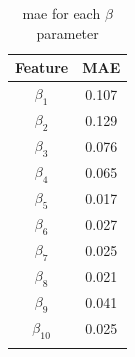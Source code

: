 \begin{table}[h]
    \centering
    \caption{\gls{mae} for each $\beta$ parameter}
    \begin{tabular}{ c c }
        \toprule
        \textbf{Feature} & \textbf{MAE} \\
        \midrule
        $\beta_1$        & 0.107        \\
        $\beta_2$        & 0.129        \\
        $\beta_3$        & 0.076        \\
        $\beta_4$        & 0.065        \\
        $\beta_5$        & 0.017        \\
        $\beta_6$        & 0.027        \\
        $\beta_7$        & 0.025        \\
        $\beta_8$        & 0.021        \\
        $\beta_9$        & 0.041        \\
        $\beta_{10}$     & 0.025        \\
        \bottomrule
        \label{tab:mae}
    \end{tabular}
\end{table}

